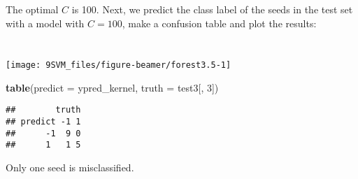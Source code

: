 \documentclass[10pt,ignorenonframetext,]{beamer}
\newenvironment{Shaded}{\begin{snugshade}}{\end{snugshade}}
\newcommand{\DataTypeTok}[1]{\textcolor[rgb]{0.13,0.29,0.53}{#1}}
\newcommand{\DecValTok}[1]{\textcolor[rgb]{0.00,0.00,0.81}{#1}}
\newcommand{\KeywordTok}[1]{\textcolor[rgb]{0.13,0.29,0.53}{\textbf{#1}}}
\newcommand{\NormalTok}[1]{#1}
\newcommand{\OperatorTok}[1]{\textcolor[rgb]{0.81,0.36,0.00}{\textbf{#1}}}
\newcommand{\StringTok}[1]{\textcolor[rgb]{0.31,0.60,0.02}{#1}}
\begin{document}
\begin{frame}[fragile]

The optimal \(C\) is 100. Next, we predict the class label of the seeds
in the test set with a model with \(C=100\), make a confusion table and
plot the results:

\(~\)

\scriptsize

\begin{Shaded}
\end{Shaded}

\(~\)

\begin{center}\texttt{[image: 9SVM\_files/figure-beamer/forest3.5-1]} \end{center}

\end{frame}

\begin{frame}[fragile]

\scriptsize

\begin{Shaded}
\begin{Highlighting}[]
\KeywordTok{table}\NormalTok{(}\DataTypeTok{predict =}\NormalTok{ ypred_kernel, }\DataTypeTok{truth =}\NormalTok{ test3[, }\DecValTok{3}\NormalTok{])}
\end{Highlighting}
\end{Shaded}

\begin{verbatim}
##        truth
## predict -1 1
##      -1  9 0
##      1   1 5
\end{verbatim}

\normalsize

Only one seed is misclassified.

\end{frame}
\end{document}
